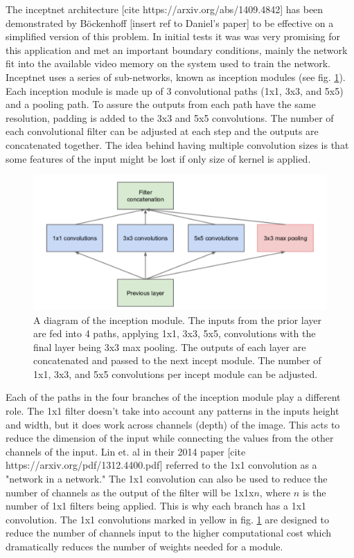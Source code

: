 \label{sec:code:inceptnet}

The inceptnet architecture [cite https://arxiv.org/abs/1409.4842] has been demonstrated by Böckenhoff [insert ref to Daniel's paper] to be effective on a simplified version of this problem. In initial tests it was was very promising for this application and met an important boundary conditions, mainly the network fit into the available video memory on the system used to train the network. Inceptnet uses a series of sub-networks, known as inception modules (see fig. \ref{fig:code:inceptmodule}). Each inception module is made up of 3 convolutional paths (1x1, 3x3, and 5x5) and a pooling path. To assure the outputs from each path have the same resolution, padding is added to the 3x3 and 5x5 convolutions. The number of each convolutional filter can be adjusted at each step and the outputs are concatenated together. The idea behind having multiple convolution sizes is that some features of the input might be lost if only size of kernel is applied.

\begin{figure}[htb]
    \includegraphics[width=\textwidth]{images/incept-simple.png}
    \caption{A diagram of the inception module. The inputs from the prior layer are fed into 4 paths, applying 1x1, 3x3, 5x5, convolutions with the final layer being 3x3 max pooling. The outputs of each layer are concatenated and passed to the next incept module. The number of 1x1, 3x3, and 5x5 convolutions per incept module can be adjusted.}
    \label{fig:code:inceptmodule}
\end{figure}

Each of the paths in the four branches of the inception module play a different role. The 1x1 filter doesn't take into account any patterns in the inputs height and width, but it does work across channels (depth) of the image. This acts to reduce the dimension of the input while connecting the values from the other channels of the input. Lin et. al in their 2014 paper [cite https://arxiv.org/pdf/1312.4400.pdf] referred to the 1x1 convolution as a "network in a network." The 1x1 convolution can also be used to reduce the number of channels as the output of the filter will be 1x1x$n$, where $n$ is the number of 1x1 filters being applied. This is why each branch has a 1x1 convolution. The 1x1 convolutions marked in yellow in fig. \ref{fig:code:inceptmodule} are designed to reduce the number of channels input to the higher computational cost which dramatically reduces the number of weights needed for a module.

